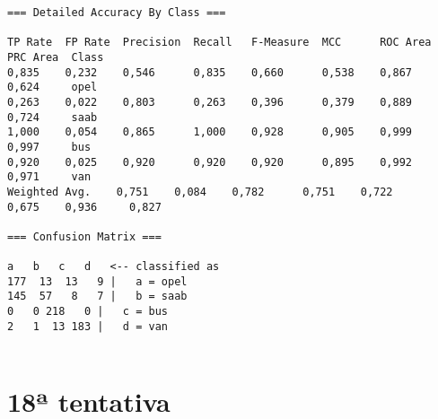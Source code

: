 \documentclass[
	article,			%
	11pt,				%
	oneside,			%
	a4paper,			%
	english,			%
	brazil,				%
	sumario=tradicional
	]{abntex2}
\begin{document}
\begin{lstlisting}
=== Detailed Accuracy By Class ===

TP Rate  FP Rate  Precision  Recall   F-Measure  MCC      ROC Area  PRC Area  Class
0,835    0,232    0,546      0,835    0,660      0,538    0,867     0,624     opel
0,263    0,022    0,803      0,263    0,396      0,379    0,889     0,724     saab
1,000    0,054    0,865      1,000    0,928      0,905    0,999     0,997     bus
0,920    0,025    0,920      0,920    0,920      0,895    0,992     0,971     van
Weighted Avg.    0,751    0,084    0,782      0,751    0,722      0,675    0,936     0,827     

=== Confusion Matrix ===

a   b   c   d   <-- classified as
177  13  13   9 |   a = opel
145  57   8   7 |   b = saab
0   0 218   0 |   c = bus
2   1  13 183 |   d = van


\end{lstlisting}

\section{18ª tentativa}
\end{document}
